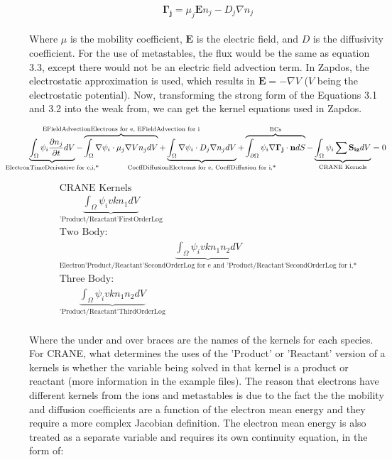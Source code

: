 \documentclass[final]{report}
\begin{document}
  \begin{equation}
      \mathbf{\Gamma_{j}}=\mu_{j}\mathbf{E}n_{j}-D_{j}\nabla n_{j}
  \end{equation}
  \\
  Where $\mu$ is the mobility coefficient, $\textbf{E}$ is the electric field, and $D$ is the diffusivity coefficient. For the use of metastables, the flux would be the same as equation 3.3, except there would not be an electric field advection term. In Zapdos, the electrostatic approximation is used, which results in $\textbf{E}=-\nabla V$ ($V$ being the electrostatic potential). Now, transforming the strong form of the Equations 3.1 and 3.2 into the weak from, we can get the kernel equations used in Zapdos.

  \begin{equation}
    \underbrace{\int_{\Omega}\psi_{i}\frac{\partial n_{j}}{\partial t} dV}_\text{\makebox[0pt]{ElectronTimeDerivative for e,i,*}}- \overbrace{\int_{\Omega}\nabla\psi_{i}\cdot\mu_{j}\nabla V n_{j} dV}^\text{\makebox[0pt]{EFieldAdvectionElectrons for e, EFieldAdvection for i}}+\underbrace{\int_{\Omega}\nabla\psi_{i}\cdot D_{j}\nabla n_{j} dV}_\text{\makebox[0pt]{CoeffDiffusionElectrons for e, CoeffDiffusion for i,*}}+\overbrace{\int_{\partial\Omega}\psi_{i}\nabla \mathbf{\Gamma_{j}}\cdot \mathbf{n} dS}^\text{\makebox[0pt]{BCs}}-\underbrace{\int_{\Omega}\psi_{i}\sum{\mathbf{S_{iz}}}  dV}_\text{\makebox[0pt]{CRANE Kernels}}=0
  \end{equation}

  \begin{equation}
    \begin{gathered}
    \text{CRANE Kernels} \\
    \underbrace{\int_{\Omega}\psi_{i}vkn_{1} dV}_\text{'Product/Reactant'FirstOrderLog} \\
    \text{Two Body:} \\
    \underbrace{\int_{\Omega}\psi_{i}vkn_{1}n_{2} dV}_\text{Electron'Product/Reactant'SecondOrderLog for e and 'Product/Reactant'SecondOrderLog for i,*} \\
    \text{Three Body:} \\
    \underbrace{\int_{\Omega}\psi_{i}vkn_{1}n_{2} dV}_\text{'Product/Reactant'ThirdOrderLog}
    \end{gathered}
  \end{equation}
  \\
  Where the under and over braces are the names of the kernels for each species. For CRANE, what determines the uses of the 'Product' or 'Reactant' version of a kernels is whether the variable being solved in that kernel is a product or reactant (more information in the example files).  The reason that electrons have different kernels from the ions and metastables is due to the fact the the mobility and diffusion coefficients are a function of the electron mean energy and they require a more complex Jacobian definition. The electron mean energy is also treated as a separate variable and requires its own continuity equation, in the form of:
\end{document}

